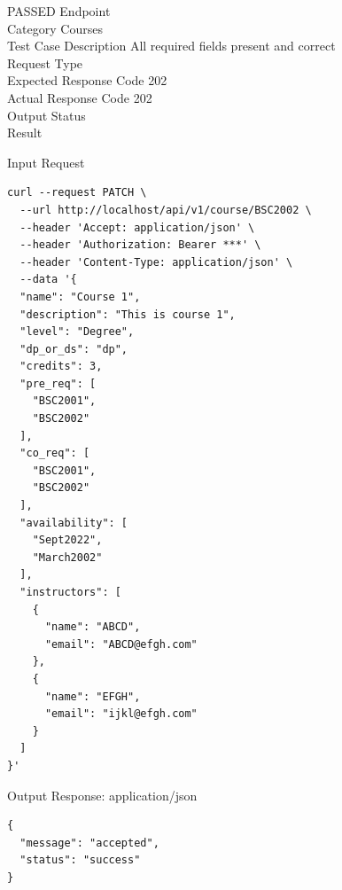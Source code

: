 \begin{testcase}{64}{PASSED}
Endpoint \hfill {}\\
Category \hfill Courses\\
Test Case Description \hfill All required fields present and correct\\

Request Type    \hfill {}\\
Expected Response Code    \hfill 202\\
Actual Response Code    \hfill 202\\

Output Status \hfill {}\\
Result \hfill {}

\begin{ipblock}{Input Request}
\begin{verbatim}
curl --request PATCH \
  --url http://localhost/api/v1/course/BSC2002 \
  --header 'Accept: application/json' \
  --header 'Authorization: Bearer ***' \
  --header 'Content-Type: application/json' \
  --data '{
  "name": "Course 1",
  "description": "This is course 1",
  "level": "Degree",
  "dp_or_ds": "dp",
  "credits": 3,
  "pre_req": [
    "BSC2001",
    "BSC2002"
  ],
  "co_req": [
    "BSC2001",
    "BSC2002"
  ],
  "availability": [
    "Sept2022",
    "March2002"
  ],
  "instructors": [
    {
      "name": "ABCD",
      "email": "ABCD@efgh.com"
    },
    {
      "name": "EFGH",
      "email": "ijkl@efgh.com"
    }
  ]
}'
\end{verbatim}
\end{ipblock}

\begin{opblock}{Output Response: application/json}
\begin{verbatim}
{
  "message": "accepted",
  "status": "success"
}
\end{verbatim}
\end{opblock}
\end{testcase}

